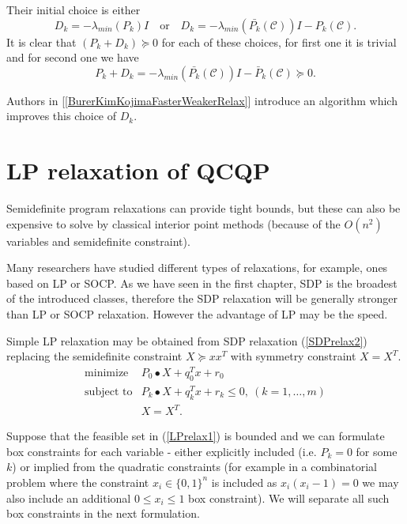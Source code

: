 \documentclass[12pt]{book}
\theoremstyle{definition}
\begin{document}
Their initial choice is either 
$$D_k = -\lambda_{min}(P_k)I  \ \ \ \mbox{ or } \ \ \  D_k =-\lambda_{min}(\bar{P_k}(\mathcal{C}))I - P_k(\mathcal{C}).$$
It is clear that $(P_k + D_k)\succeq 0$ for each of these choices, for first one it is trivial and for second one we have
$$P_k+D_k =  -\lambda_{min}(\bar{P_k}(\mathcal{C}))I - \bar{P}_k(\mathcal{C})\succeq 0.$$

Authors in [\ref{BurerKimKojimaFasterWeakerRelax}] introduce an algorithm which improves this choice of $D_k$.



\section{LP relaxation of QCQP}
\label{SectionLPRelaxationsOfQCQP}

Semidefinite program relaxations can provide tight bounds, but these can also be expensive to solve by classical interior point methods (because of the $O(n^2)$ variables and semidefinite constraint). 

Many researchers have studied different types of relaxations, for example, ones based on LP or SOCP. 
As we have seen in the first chapter, SDP is the broadest of the introduced classes, therefore the SDP relaxation will be generally stronger than LP or SOCP relaxation. However the advantage of LP may be the speed. 

Simple LP relaxation may be obtained from SDP relaxation (\ref{SDPrelax2}) replacing the semidefinite constraint $X\succeq xx^T$ with symmetry constraint $X = X^T$.
\begin{equation}
\label{LPrelax1} 
\begin{array}{ll}
\mbox{minimize}& P_0\bullet X + q_0^Tx + r_0\\
\mbox{subject to}& P_k\bullet X+ q_k^Tx + r_k \leq 0, \  (k = 1,\dots ,m)\\
& X = X^T.
\end{array} 
\end{equation}

Suppose that the feasible set in (\ref{LPrelax1}) is bounded and we can formulate box constraints for each variable - either explicitly included (i.e.  $P_k=0$ for some $k$) or implied from the quadratic constraints (for example in a combinatorial problem where the constraint $x_i\in \{0,1\}^n$ is included as $x_i(x_i-1) = 0$ we may also include an additional $0\leq x_i \leq 1$ box constraint). We will separate all such box constraints in the next formulation. 
\end{document}
